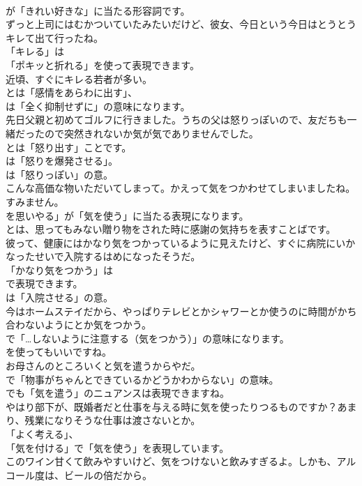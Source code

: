 \documentclass[8pt]{extreport}
\begin{document}
\begin{CJK}{UTF8}{min}
\\	が「きれい好きな」に当たる形容詞です。	
\\	ずっと上司にはむかついていたみたいだけど、彼女、今日という今日はとうとうキレて出て行ったね。 
\\	「キレる」は
\\	「ポキッと折れる」を使って表現できます。	
\\	近頃、すぐにキレる若者が多い。 
\\	とは「感情をあらわに出す」、
\\	は「全く抑制せずに」の意味になります。	
\\	先日父親と初めてゴルフに行きました。うちの父は怒りっぽいので、友だちも一緒だったので突然きれないか気が気でありませんでした。 
\\	とは「怒り出す」ことです。
\\	は「怒りを爆発させる」。
\\	は「怒りっぽい」の意。	
\\	こんな高価な物いただいてしまって。かえって気をつかわせてしまいましたね。すみません。 
\\	を思いやる」が「気を使う」に当たる表現になります。
\\	とは、思ってもみない贈り物をされた時に感謝の気持ちを表すことばです。	
\\	彼って、健康にはかなり気をつかっているように見えたけど、すぐに病院にいかなったせいで入院するはめになったそうだ。 
\\	「かなり気をつかう」は
\\	で表現できます。
\\	は「入院させる」の意。	
\\	今はホームステイだから、やっぱりテレビとかシャワーとか使うのに時間がかち合わないようにとか気をつかう。 
\\	で「…しないように注意する（気をつかう）」の意味になります。
\\	を使ってもいいですね。	
\\	お母さんのところいくと気を遣うからやだ。 
\\	で「物事がちゃんとできているかどうかわからない」の意味。
\\	でも「気を遣う」のニュアンスは表現できますね。	
\\	やはり部下が、既婚者だと仕事を与える時に気を使ったりつるものですか？あまり、残業になりそうな仕事は渡さないとか。 
\\	「よく考える」、
\\	「気を付ける」で「気を使う」を表現しています。	
\\	このワイン甘くて飲みやすいけど、気をつけないと飲みすぎるよ。しかも、アルコール度は、ビールの倍だから。 

\end{CJK}
\end{document}
